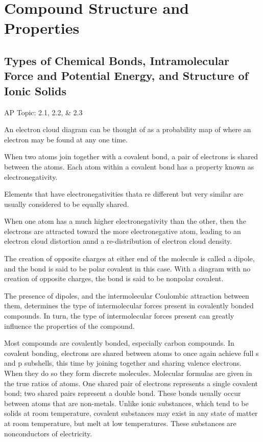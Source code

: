 \documentclass[../chem.tex]{subfiles}
\begin{document}
\chapter{Compound Structure and Properties}
\section{Types of Chemical Bonds, Intramolecular Force and Potential Energy, and Structure of Ionic Solids}
AP Topic: 2.1, 2.2, \& 2.3

An electron cloud diagram can be thought of as a probability map of where an electron may be found at any one time. 

When two atoms join together with a covalent bond, a pair of electrons is shared between the atoms. Each atom within a covalent bond has a property
known as electronegativity. 

Elements that have electronegativities thata re different but very similar are usually considered to be equally shared. 

When one atom has a much higher electronegativity than the other, then the electrons are attracted toward the more electronegative atom, 
leading to an electron cloud distortion annd a re-distribution of electron cloud density.

The creation of opposite charges at either end of the molecule is called a dipole, and the bond is said to be polar covalent in this case.
With a diagram with no creation of opposite charges, the bond is said to be nonpolar covalent.

The presence of dipoles, and the intermolecular Coulombic attraction between them, determines the type of intermolecular forces 
present in covalently bonded compounds. In turn, the type of intermolecular forces present can greatly influence the properties of the compound.

Most compounds are covalently bonded, especially carbon compounds. In covalent bonding, electrons are shared between atoms to once again achieve 
full s and p subshells, this time by joining together and sharing valence electrons. When they do so they form discrete molecules. Molecular formulas 
are given in the true ratios of atoms. One shared pair of electrons represents a single covalent bond; two shared pairs represent a double bond.
These bonds usually occur between atoms that are non-metals. Unlike ionic substances, which tend to be solids at room temperature, covalent substances 
may exist in any state of matter at room temperature, but melt at low temperatures. These substances are nonconductors of electricity.
\end{document}
